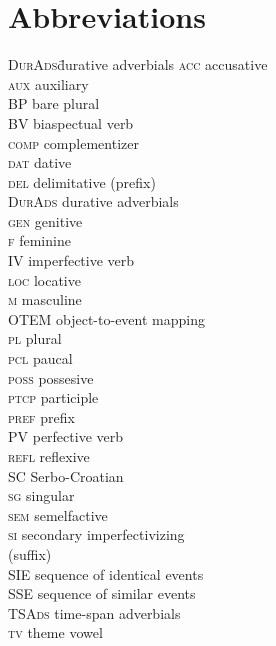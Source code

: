 \documentclass[output=paper,colorlinks,citecolor=brown]{langscibook}
\begin{document}
\section*{Abbreviations}
\begin{multicols}{2}
\begin{tabbing}
\textsc{DurAds}\hspace{.5em}\= durative adverbials \kill
\textsc{acc} \> accusative \\
\textsc{aux} \> auxiliary \\
\textsc{BP} \> bare plural \\
\textsc{BV} \> biaspectual verb \\
\textsc{comp} \>  complementizer \\
\textsc{dat} \> dative \\
\textsc{del} \> delimitative (prefix) \\
\textsc{DurAds} \> durative adverbials \\
\textsc{gen} \>  genitive \\
\textsc{f} \> feminine \\
\textsc{IV} \> imperfective verb \\
\textsc{loc} \> locative \\
\textsc{m} \> masculine \\
\textsc{OTEM} \> object-to-event mapping \\
\textsc{pl} \> plural \\
\textsc{pcl} \> paucal \\
\textsc{poss} \> possesive \\
\textsc{ptcp} \> participle \\
\textsc{pref} \> prefix \\
\textsc{PV} \> perfective verb \\
\textsc{refl} \>  reflexive \\
\textsc{SC} \> Serbo-Croatian \\
\textsc{sg} \> singular \\
\textsc{sem} \> semelfactive \\
\textsc{si} \> secondary imperfectivizing \\ \> (suffix) \\
\textsc{SIE} \> sequence of identical events \\
\textsc{SSE} \> sequence of similar events \\
\textsc{TSAds} \> time-span adverbials \\
\textsc{tv} \> theme vowel \\
\end{tabbing}
\end{multicols}
\end{document}
